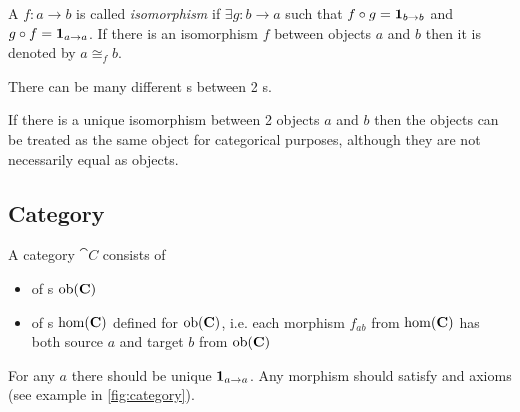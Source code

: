 \begin{definition}[Isomorphism]
\label{def:isomorphism} 
A  $f: a \to b$ is called \textit{isomorphism} if
$\exists g: b \to a$ such that $f \circ g = \mathbf{1}_{ b \to b }$ 
and $g \circ f = \mathbf{1}_{ a \to a }$.  
If there is an isomorphism $f$ between objects $a$ and $b$
then it is denoted by $a \cong_f b$. 
\end{definition}

\begin{remark}[Isomorphism]
\label{rem:isomorphism}
There can be many different s between 2
s. 

If there is a unique isomorphism between 2 objects $a$ and $b$ then the objects
can be treated as the same object for categorical purposes, although they are
not necessarily equal as objects.
\end{remark}

\subsection{Category}

\begin{definition}[Category]
  \label{def:category}
  A category $\cat{C}$ consists of 
  \begin{itemize}
  \item {} of
    s $\mathrm{ob}(\mathbf{C})$
  \item {} of s $\mathrm{hom}(\mathbf{C})$
    defined for $\mathrm{ob}(\mathbf{C})$, i.e. each morphism $f_{ab}$ from 
    $\mathrm{hom}(\mathbf{C})$ has both source
    $a$ and target $b$ from $\mathrm{ob}(\mathbf{C})$
  \end{itemize}
  For any  $a$ there should be unique
   $\mathbf{1}_{ a \to a }$. Any morphism should satisfy
   and  axioms
  (see example in \cref{fig:category}).    
\end{definition}

